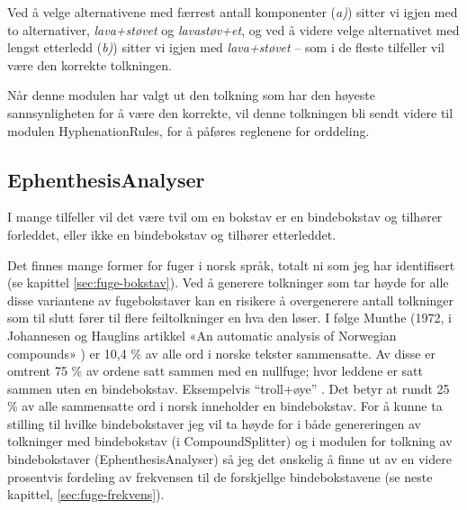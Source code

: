 \newline
{}\newline
{}\newline
{}\newline
{}\newline
{}\newline
{}\newline
{}\newline
{}\newline
{}\newline
{}\newline
{}

Ved å velge alternativene med færrest antall komponenter (\textit{a)}) sitter vi igjen med to alternativer, \textit{lava+støvet} og \textit{lavastøv+et}, og ved å videre velge alternativet med lengst etterledd (\textit{b)}) sitter vi igjen med \textit{lava+støvet} -- som i de fleste tilfeller vil være den korrekte tolkningen.

Når denne modulen har valgt ut den tolkning som har den høyeste sannsynligheten for å være den korrekte, vil denne tolkningen bli sendt videre til modulen HyphenationRules, for å påføres reglenene for orddeling.

\subsection{EphenthesisAnalyser}
\label{sec:eph}

I mange tilfeller vil det være tvil om en bokstav er en bindebokstav og tilhører forleddet, eller ikke en bindebokstav og tilhører etterleddet. 

\newline
{}

Det finnes mange former for fuger i norsk språk, totalt ni som jeg har identifisert (se kapittel \ref{sec:fuge-bokstav}). Ved å generere tolkninger som tar høyde for alle disse variantene av fugebokstaver kan en risikere å overgenerere antall tolkninger som til slutt fører til flere feiltolkninger en hva den løser. I følge Munthe (1972, i Johannesen og Hauglins artikkel «An automatic analysis of Norwegian compounds» \cite{johannessen1996automatic}) er 10,4 \% av alle ord i norske tekster sammensatte. Av disse er omtrent 75 \% av ordene satt sammen med en nullfuge; hvor leddene er satt sammen uten en bindebokstav. Eksempelvis “troll+øye” \cite{johannessen1996automatic}. Det betyr at rundt 25 \% av alle sammensatte ord i norsk inneholder en bindebokstav. For å kunne ta stilling til hvilke bindebokstaver jeg vil ta høyde for i både genereringen av tolkninger med bindebokstav (i CompoundSplitter) og i modulen for tolkning av bindebokstaver (EphenthesisAnalyser) så jeg det ønskelig å finne ut av en videre prosentvis fordeling av frekvensen til de forskjellge bindebokstavene (se neste kapittel, \ref{sec:fuge-frekvens}). 

